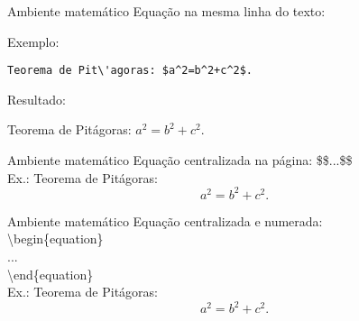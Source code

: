 \documentclass{beamer}
\newcommand{\tbs}{\textbackslash}
\begin{document}
\begin{frame}[fragile]{Ambiente matem\'atico}
    Equa\c{c}\~ao na mesma linha do texto:

    \vspace{0.5cm}
    Exemplo:
    \begin{lstlisting}[style=limpo]
        Teorema de Pit\'agoras: $a^2=b^2+c^2$.
    \end{lstlisting}

    Resultado: \\
    \begin{center}
        Teorema de Pit\'agoras: $a^2=b^2+c^2$.
    \end{center}
\end{frame}

\begin{frame}{Ambiente matem\'atico}
    Equa\c{c}\~ao centralizada na p\'agina: \$\$...\$\$ \\
    Ex.: Teorema de Pit\'agoras: $$a^2=b^2+c^2.$$
\end{frame}

\begin{frame}{Ambiente matem\'atico}
    Equa\c{c}\~ao centralizada e numerada: \\
    \tbs begin\{equation\} \\
    ... \\
    \tbs end\{equation\} \\
    Ex.: Teorema de Pit\'agoras: \begin{equation}a^2=b^2+c^2.\end{equation}
\end{frame}
\end{document}
